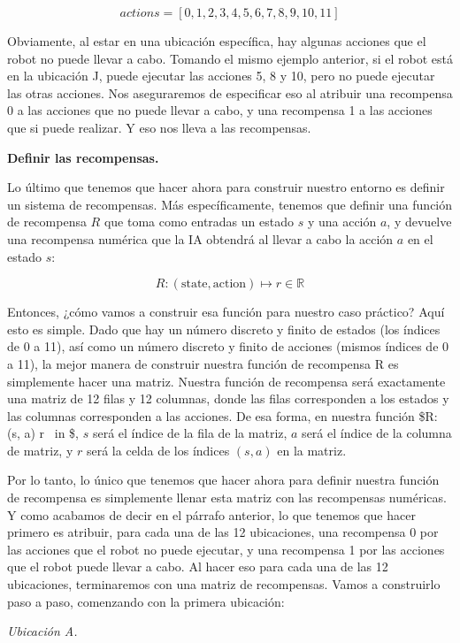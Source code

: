 \documentclass[
]{book}
\begin{document}
\[actions = [0,1,2,3,4,5,6,7,8,9,10,11]\]

Obviamente, al estar en una ubicación específica, hay algunas acciones que el robot no puede llevar a cabo. Tomando el mismo ejemplo anterior, si el robot está en la ubicación J, puede ejecutar las acciones 5, 8 y 10, pero no puede ejecutar las otras acciones. Nos aseguraremos de especificar eso al atribuir una recompensa 0 a las acciones que no puede llevar a cabo, y una recompensa 1 a las acciones que si puede realizar. Y eso nos lleva a las recompensas.

\textbf{Definir las recompensas.}

Lo último que tenemos que hacer ahora para construir nuestro entorno es definir un sistema de recompensas. Más específicamente, tenemos que definir una función de recompensa \(R\) que toma como entradas un estado \(s\) y una acción \(a\), y devuelve una recompensa numérica que la IA obtendrá al llevar a cabo la acción \(a\) en el estado \(s\):

\[R : (\textrm{state}, \textrm{action}) \mapsto r \in \mathbb{R}\]

Entonces, ¿cómo vamos a construir esa función para nuestro caso práctico? Aquí esto es simple. Dado que hay un número discreto y finito de estados (los índices de 0 a 11), así como un número discreto y finito de acciones (mismos índices de 0 a 11), la mejor manera de construir nuestra función de recompensa R es simplemente hacer una matriz. Nuestra función de recompensa será exactamente una matriz de 12 filas y 12 columnas, donde las filas corresponden a los estados y las columnas corresponden a las acciones. De esa forma, en nuestra función \$R: (s, a) \mapsto r ~in  \$, \(s\) será el índice de la fila de la matriz, \(a\) será el índice de la columna de matriz, y \(r\) será la celda de los índices \((s, a)\) en la matriz.

Por lo tanto, lo único que tenemos que hacer ahora para definir nuestra función de recompensa es simplemente llenar esta matriz con las recompensas numéricas. Y como acabamos de decir en el párrafo anterior, lo que tenemos que hacer primero es atribuir, para cada una de las 12 ubicaciones, una recompensa 0 por las acciones que el robot no puede ejecutar, y una recompensa 1 por las acciones que el robot puede llevar a cabo. Al hacer eso para cada una de las 12 ubicaciones, terminaremos con una matriz de recompensas. Vamos a construirlo paso a paso, comenzando con la primera ubicación:

\emph{Ubicación A.}
\end{document}

